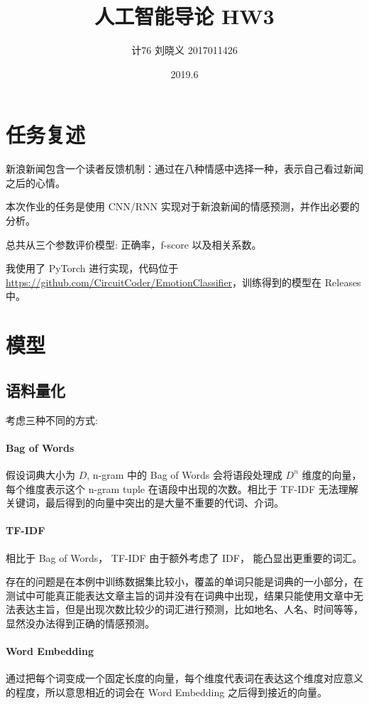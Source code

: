 \documentclass{ctexart}
\title{人工智能导论 HW3}
\author{计76 刘晓义 2017011426}
\date{2019.6}
\begin{document}
\maketitle

\section{任务复述}
新浪新闻包含一个读者反馈机制：通过在八种情感中选择一种，表示自己看过新闻之后的心情。

本次作业的任务是使用 CNN/RNN 实现对于新浪新闻的情感预测，并作出必要的分析。

总共从三个参数评价模型: 正确率，f-score 以及相关系数。

我使用了 PyTorch 进行实现，代码位于 \url{https://github.com/CircuitCoder/EmotionClassifier}，训练得到的模型在 Releases 中。

\section{模型}
\subsection{语料量化}
考虑三种不同的方式:
\paragraph{Bag of Words}
假设词典大小为 $D$, n-gram 中的 Bag of Words 会将语段处理成 $D^n$ 维度的向量，每个维度表示这个 n-gram tuple 在语段中出现的次数。相比于 TF-IDF 无法理解关键词，最后得到的向量中突出的是大量不重要的代词、介词。

\paragraph{TF-IDF}
相比于 Bag of Words， TF-IDF 由于额外考虑了 IDF， 能凸显出更重要的词汇。

存在的问题是在本例中训练数据集比较小，覆盖的单词只能是词典的一小部分，在测试中可能真正能表达文章主旨的词并没有在词典中出现，结果只能使用文章中无法表达主旨，但是出现次数比较少的词汇进行预测，比如地名、人名、时间等等，显然没办法得到正确的情感预测。

\paragraph{Word Embedding}
通过把每个词变成一个固定长度的向量，每个维度代表词在表达这个维度对应意义的程度，所以意思相近的词会在 Word Embedding 之后得到接近的向量。
\end{document}
